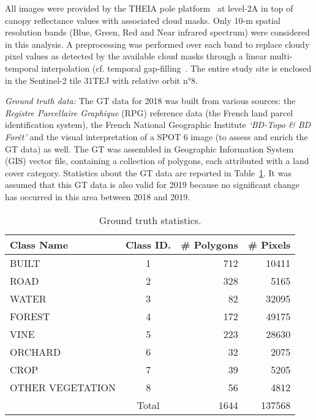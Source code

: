 All images were provided by the THEIA pole platform~ at level-2A in top of canopy reflectance values with associated cloud masks. Only 10-m spatial resolution bands (Blue, Green, Red and Near infrared spectrum) were considered in this analysis. A preprocessing was performed over each band to replace cloudy pixel values as detected by the available cloud masks through a linear multi-temporal interpolation (cf. temporal gap-filling~. The entire study site is enclosed in the Sentinel-2 tile 31TEJ with relative orbit n°8.

\textit{Ground truth data:} The GT data for 2018 was built from various sources: the \textit{Registre Parcellaire Graphique} (RPG) reference data (the French land parcel identification system), the French National Geographic Institute \textit{‘BD-Topo \& BD Forêt’} and the visual interpretation of a SPOT 6 image (to assess and enrich the GT data) as well. The GT was assembled in Geographic Information System (GIS) vector file, containing a collection of polygons, each attributed with a land cover category. Statistics about the GT data are reported in Table~\ref{tab:gt}.
It was assumed that this GT data is also valid for 2019 because no significant change has occurred in this area between 2018 and 2019. 

\begin{table}[htb]
\centering
\scriptsize
\begin{tabular}{ |l|c|r|r| }
 \hline
 Class Name & Class ID. & \# Polygons & \# Pixels \\ 
 \hline
 BUILT & 1 & 712 & 10411\\
 ROAD & 2 & 328 & 5165 \\
 WATER & 3 & 82 & 32095 \\  
 FOREST & 4 & 172 & 49175 \\  
 VINE & 5 & 223 & 28630 \\
 ORCHARD & 6 & 32 & 2075 \\
 CROP & 7 & 39 & 5205 \\
 OTHER VEGETATION & 8 & 56 & 4812 \\
 \hline
 & Total & 1644 & 137568 \\
 \hline
\end{tabular}
\caption{Ground truth statistics.}
\label{tab:gt}
\end{table}

